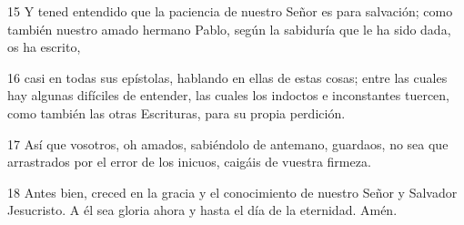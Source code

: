 \par 15 Y tened entendido que la paciencia de nuestro Señor es para salvación; como también nuestro amado hermano Pablo, según la sabiduría que le ha sido dada, os ha escrito,
\par 16 casi en todas sus epístolas, hablando en ellas de estas cosas; entre las cuales hay algunas difíciles de entender, las cuales los indoctos e inconstantes tuercen, como también las otras Escrituras, para su propia perdición.
\par 17 Así que vosotros, oh amados, sabiéndolo de antemano, guardaos, no sea que arrastrados por el error de los inicuos, caigáis de vuestra firmeza.
\par 18 Antes bien, creced en la gracia y el conocimiento de nuestro Señor y Salvador Jesucristo. A él sea gloria ahora y hasta el día de la eternidad. Amén.

